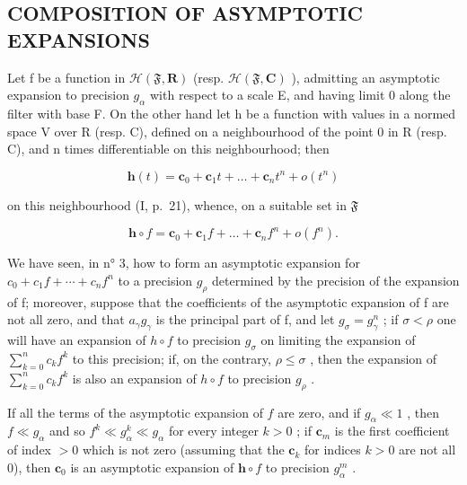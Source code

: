 \subsection{COMPOSITION OF ASYMPTOTIC EXPANSIONS}

Let f be a function in \(\mathcal{H}(\mathfrak{F},\mathbf{R})\) (resp. \(\mathcal{H}(\mathfrak{F},\mathbf{C})\) ), admitting an asymptotic expansion to precision \(g_{\alpha}\) with respect to a scale E, and having limit 0 along the filter with base F. On the other hand let h be a function with values in a normed space V over R (resp. C), defined on a neighbourhood of the point 0 in R (resp. C), and n times differentiable on this neighbourhood; then

\[
\mathbf {h} (t) = \mathbf {c} _ {0} + \mathbf {c} _ {1} t + \dots + \mathbf {c} _ {n} t ^ {n} + o (t ^ {n})
\]

on this neighbourhood (I, p.~21), whence, on a suitable set in \(\mathfrak{F}\)

\[
\mathbf {h} \circ f = \mathbf {c} _ {0} + \mathbf {c} _ {1} f + \dots + \mathbf {c} _ {n} f ^ {n} + o (f ^ {n}).
\]

We have seen, in n° 3, how to form an asymptotic expansion for \(c_{0} + c_{1}f + \cdots + c_{n}f^{n}\) to a precision \(g_{\rho}\) determined by the precision of the expansion of f; moreover, suppose that the coefficients of the asymptotic expansion of f are not all zero, and that \(a_{\gamma}g_{\gamma}\) is the principal part of f, and let \(g_{\sigma} = g_{\gamma}^{n}\) ; if \(\sigma < \rho\) one will have an expansion of \(h \circ f\) to precision \(g_{\sigma}\) on limiting the expansion of \(\sum_{k=0}^{n} c_{k}f^{k}\) to this precision; if, on the contrary, \(\rho \leqslant \sigma\) , then the expansion of \(\sum_{k=0}^{n} c_{k}f^{k}\) is also an expansion of \(h \circ f\) to precision \(g_{\rho}\) .

If all the terms of the asymptotic expansion of \(f\) are zero, and if \(g_{\alpha} \ll 1\) , then \(f \ll g_{\alpha}\) and so \(f^k \ll g_{\alpha}^k \ll g_{\alpha}\) for every integer \(k > 0\) ; if \(\mathbf{c}_m\) is the first coefficient of index \(> 0\) which is not zero (assuming that the \(\mathbf{c}_k\) for indices \(k > 0\) are not all 0), then \(\mathbf{c}_0\) is an asymptotic expansion of \(\mathbf{h} \circ f\) to precision \(g_{\alpha}^{m}\) .

